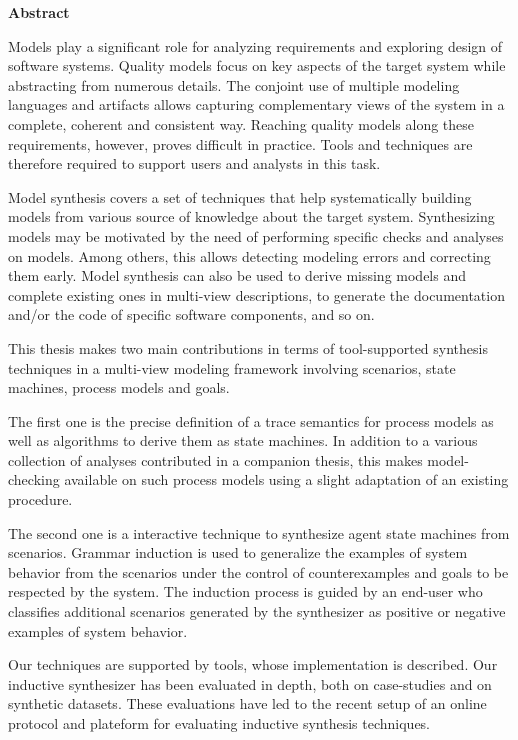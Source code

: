 \begin{center}
\textbf{\large Abstract}
\end{center}

Models play a significant role for analyzing requirements and exploring design of software systems. Quality models focus on key aspects of the target system while abstracting from numerous details. The conjoint use of multiple modeling languages and artifacts allows capturing complementary views of the system in a complete, coherent and consistent way. Reaching quality models along these requirements, however, proves difficult in practice. Tools and techniques are therefore required to support users and analysts in this task.

Model synthesis covers a set of techniques that help systematically building models from various source of knowledge about the target system. Synthesizing models may be motivated by the need of performing specific checks and analyses on models. Among others, this allows detecting modeling errors and correcting them early. Model synthesis can also be used to derive missing models and complete existing ones in multi-view descriptions, to generate the documentation and/or the code of specific software components, and so on.

This thesis makes two main contributions in terms of tool-supported synthesis techniques in a multi-view modeling framework involving scenarios, state machines, process models and goals. 

The first one is the precise definition of a trace semantics for process models as well as algorithms to derive them as state machines. In addition to a various collection of analyses contributed in a companion thesis, this makes model-checking available on such process models using a slight adaptation of an existing procedure.

The second one is a interactive technique to synthesize agent state machines from scenarios. Grammar induction is used to generalize the examples of system behavior from the scenarios under the control of counterexamples and goals to be respected by the system. The induction process is guided by an end-user who classifies additional scenarios generated by the synthesizer as positive or negative examples of system behavior.

Our techniques are supported by tools, whose implementation is described. Our inductive synthesizer has been evaluated in depth, both on case-studies and on synthetic datasets. These evaluations have led to the recent setup of an online protocol and plateform for evaluating inductive synthesis techniques.
